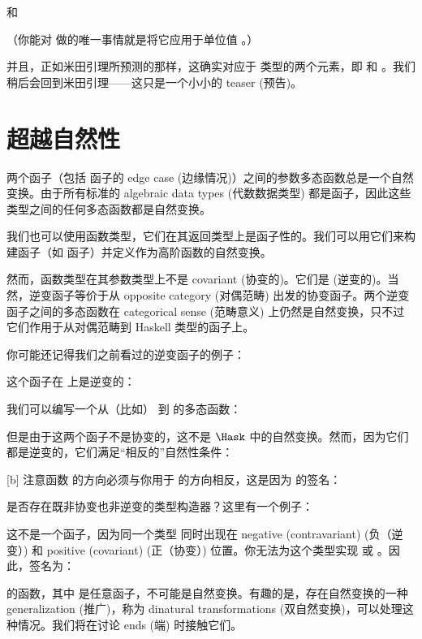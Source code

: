 和

（你能对  做的唯一事情就是将它应用于单位值 \code{()}。）

并且，正如米田引理所预测的那样，这确实对应于  类型的两个元素，即  和 。我们稍后会回到米田引理——这只是一个小小的 teaser (预告)。

\section{超越自然性}

两个函子（包括  函子的 edge case (边缘情况)）之间的参数多态函数总是一个自然变换。由于所有标准的 algebraic data types (代数数据类型) 都是函子，因此这些类型之间的任何多态函数都是自然变换。

我们也可以使用函数类型，它们在其返回类型上是函子性的。我们可以用它们来构建函子（如  函子）并定义作为高阶函数的自然变换。

然而，函数类型在其参数类型上不是 covariant (协变的)。它们是  (逆变的)。当然，逆变函子等价于从 opposite category (对偶范畴) 出发的协变函子。两个逆变函子之间的多态函数在 categorical sense (范畴意义) 上仍然是自然变换，只不过它们作用于从对偶范畴到 Haskell 类型的函子上。

你可能还记得我们之前看过的逆变函子的例子：

这个函子在  上是逆变的：

我们可以编写一个从（比如） 到  的多态函数：

但是由于这两个函子不是协变的，这不是 $\Hask$ 中的自然变换。然而，因为它们都是逆变的，它们满足“相反的”自然性条件：

[b]
注意函数  的方向必须与你用于  的方向相反，这是因为  的签名：

是否存在既非协变也非逆变的类型构造器？这里有一个例子：

这不是一个函子，因为同一个类型  同时出现在 negative (contravariant) (负（逆变）) 和 positive (covariant) (正（协变）) 位置。你无法为这个类型实现  或 。因此，签名为：

的函数，其中  是任意函子，不可能是自然变换。有趣的是，存在自然变换的一种 generalization (推广)，称为 dinatural transformations (双自然变换)，可以处理这种情况。我们将在讨论 ends (端) 时接触它们。

